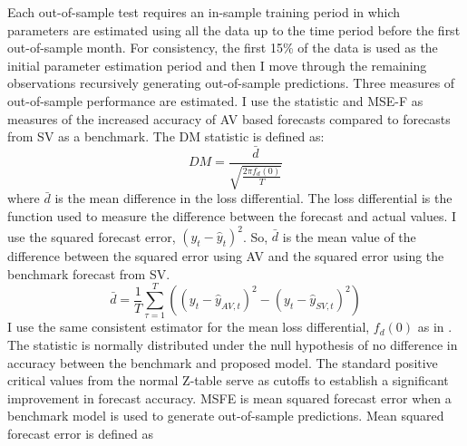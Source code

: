Each out-of-sample test requires an in-sample training period in which parameters are estimated using all the data up to the time period before the first out-of-sample month. For consistency, the first 15\% of the data is used as the initial parameter estimation period and  then I move through the remaining  observations recursively generating out-of-sample predictions. Three measures of out-of-sample performance are estimated.
I use the \citet{Diebold1995} statistic and \citet{mccracken_asymptotics_2007} MSE-F as measures of the increased accuracy of AV based forecasts compared to forecasts from SV as a benchmark. The DM statistic is defined as:
\begin{equation}
	DM = \frac{\bar{d}}{\sqrt{\frac{2\pi f_{d}(0)}{T}}}
\end{equation}
where $\bar{d}$ is the mean difference in the loss differential. The loss differential is the function used to measure the difference between the forecast and actual values. I use the squared forecast error, $(y_{t} - \hat{y}_{t})^{2}$. So, $\bar{d}$ is the mean value of the difference between the squared error using AV and the squared error using the benchmark forecast from SV.
\begin{equation}
	\bar{d} = \frac{1}{T}\sum^{T}_{\tau=1}((y_{t} - \hat{y}_{AV,t})^{2} - (y_{t} - \hat{y}_{SV,t})^{2})
\end{equation}
I use the same consistent estimator for the mean loss differential, $f_{d}(0)$ as in \citet{Diebold1995}. The statistic is normally distributed under the null hypothesis of no difference in accuracy between the benchmark and proposed model. The standard positive critical values from the normal Z-table serve as cutoffs to establish a significant improvement in forecast accuracy. MSFE is mean squared forecast error when a benchmark model is used to generate out-of-sample predictions. Mean squared forecast error is defined as

